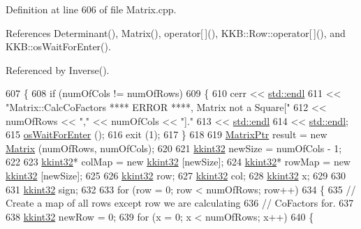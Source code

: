 Definition at line 606 of file Matrix.\+cpp.



References Determinant(), Matrix(), operator\mbox{[}$\,$\mbox{]}(), K\+K\+B\+::\+Row\+::operator\mbox{[}$\,$\mbox{]}(), and K\+K\+B\+::os\+Wait\+For\+Enter().



Referenced by Inverse().


\begin{DoxyCode}
607 \{
608   \textcolor{keywordflow}{if}  (numOfCols != numOfRows)
609   \{
610     cerr << \hyperlink{namespace_k_k_b_ad1f50f65af6adc8fa9e6f62d007818a8}{std::endl}
611          << \textcolor{stringliteral}{"Matrix::CalcCoFactors   **** ERROR ****,  Matrix not a Square["}
612          << numOfRows << \textcolor{stringliteral}{","} << numOfCols << \textcolor{stringliteral}{"]."}
613          << \hyperlink{namespace_k_k_b_ad1f50f65af6adc8fa9e6f62d007818a8}{std::endl}
614          << \hyperlink{namespace_k_k_b_ad1f50f65af6adc8fa9e6f62d007818a8}{std::endl};
615     \hyperlink{namespace_k_k_b_a255aa69aade7f429585349d08973e09f}{osWaitForEnter} ();
616     exit (1);
617   \}
618 
619   \hyperlink{class_k_k_b_1_1_matrix}{MatrixPtr}  result = \textcolor{keyword}{new} \hyperlink{class_k_k_b_1_1_matrix_a2dba13c45127354c9f75ef576f49269b}{Matrix} (numOfRows, numOfCols);
620 
621   \hyperlink{namespace_k_k_b_a8fa4952cc84fda1de4bec1fbdd8d5b1b}{kkint32}  newSize = numOfCols - 1;
622 
623   \hyperlink{namespace_k_k_b_a8fa4952cc84fda1de4bec1fbdd8d5b1b}{kkint32}*  colMap = \textcolor{keyword}{new} \hyperlink{namespace_k_k_b_a8fa4952cc84fda1de4bec1fbdd8d5b1b}{kkint32} [newSize];
624   \hyperlink{namespace_k_k_b_a8fa4952cc84fda1de4bec1fbdd8d5b1b}{kkint32}*  rowMap = \textcolor{keyword}{new} \hyperlink{namespace_k_k_b_a8fa4952cc84fda1de4bec1fbdd8d5b1b}{kkint32} [newSize];
625 
626   \hyperlink{namespace_k_k_b_a8fa4952cc84fda1de4bec1fbdd8d5b1b}{kkint32}  row;
627   \hyperlink{namespace_k_k_b_a8fa4952cc84fda1de4bec1fbdd8d5b1b}{kkint32}  col;
628   \hyperlink{namespace_k_k_b_a8fa4952cc84fda1de4bec1fbdd8d5b1b}{kkint32}  x;
629 
630 
631   \hyperlink{namespace_k_k_b_a8fa4952cc84fda1de4bec1fbdd8d5b1b}{kkint32}  sign;  
632 
633   \textcolor{keywordflow}{for}  (row = 0; row < numOfRows; row++)
634   \{
635     \textcolor{comment}{// Create a map of all rows except row we are calculating }
636     \textcolor{comment}{// CoFactors for.}
637 
638     \hyperlink{namespace_k_k_b_a8fa4952cc84fda1de4bec1fbdd8d5b1b}{kkint32}  newRow = 0;
639     \textcolor{keywordflow}{for}  (x = 0; x < numOfRows; x++)
640     \{

\end{DoxyCode}
